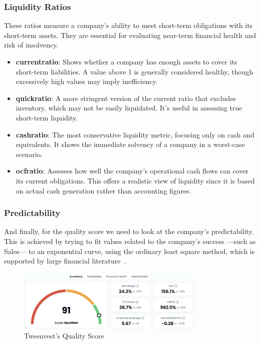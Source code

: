\documentclass[11pt,english,a4paper,hidelinks]{book}
\begin{document}
\subsubsection{Liquidity Ratios}
These ratios measure a company's ability to meet short-term obligations with its short-term assets. They are essential for evaluating near-term financial health and risk of insolvency.

\begin{itemize}
    \item \textbf{\acrshort{currentratio}}: Shows whether a company has enough assets to cover its short-term liabilities. A value above 1 is generally considered healthy, though excessively high values may imply inefficiency.
    
    \item \textbf{\acrshort{quickratio}}: A more stringent version of the current ratio that excludes inventory, which may not be easily liquidated. It's useful in assessing true short-term liquidity.
    
    \item \textbf{\acrshort{cashratio}}: The most conservative liquidity metric, focusing only on cash and equivalents. It shows the immediate solvency of a company in a worst-case scenario.
    
    \item \textbf{\acrshort{ocfratio}}: Assesses how well the company's operational cash flows can cover its current obligations. This offers a realistic view of liquidity since it is based on actual cash generation rather than accounting figures.
\end{itemize}

\subsubsection{Predictability}

\noindent And finally, for the quality score we need to look at the company's predictability. This is achieved by trying to fit values related to the company's success —such as Sales— to an exponential curve, using the ordinary least square method, which is supported by large financial literature~\cite{msci2024fundamental}.


\begin{figure}[H]
    \centering
    \includegraphics[width=0.8\textwidth]{images/tweenvest/quality score.png}
    \caption{Tweenvest's Quality Score}
    \label{fig:quality_score}
\end{figure}
\end{document}
